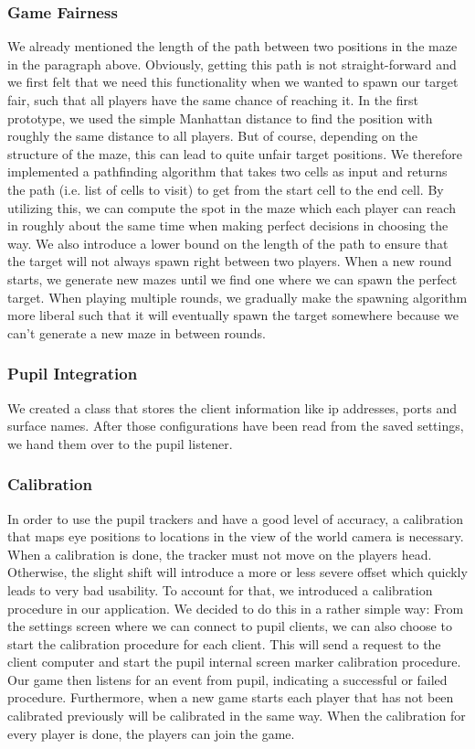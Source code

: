 \documentclass{sigchi}
\begin{document}
\subsubsection{Game Fairness}
We already mentioned the length of the path between two positions in the maze in the paragraph above. Obviously, getting this path is not straight-forward and we first felt that we need this functionality when we wanted to spawn our target fair, such that all players have the same chance of reaching it. In the first prototype, we used the simple Manhattan distance to find the position with roughly the same distance to all players. But of course, depending on the structure of the maze, this can lead to quite unfair target positions. We therefore implemented a pathfinding algorithm that takes two cells as input and returns the path (i.e. list of cells to visit) to get from the start cell to the end cell. By utilizing this, we can compute the spot in the maze which each player can reach in roughly about the same time when making perfect decisions in choosing the way. We also introduce a lower bound on the length of the path to ensure that the target will not always spawn right between two players. When a new round starts, we generate new mazes until we find one where we can spawn the perfect target. When playing multiple rounds, we gradually make the spawning algorithm more liberal such that it will eventually spawn the target somewhere because we can't generate a new maze in between rounds.

\subsubsection{Pupil Integration}
We created a class that stores the client information like ip addresses, ports and surface names. After those configurations have been read from the saved settings, we hand them over to the pupil listener.

\subsubsection{Calibration}
In order to use the pupil trackers and have a good level of accuracy, a calibration that maps eye positions to locations in the view of the world camera is necessary. When a calibration is done, the tracker must not move on the players head. Otherwise, the slight shift will introduce a more or less severe offset which quickly leads to very bad usability. To account for that, we introduced a calibration procedure in our application. We decided to do this in a rather simple way: From the settings screen where we can connect to pupil clients, we can also choose to start the calibration procedure for each client. This will send a request to the client computer and start the pupil internal screen marker calibration procedure. Our game then listens for an event from pupil, indicating a successful or failed procedure. Furthermore, when a new game starts each player that has not been calibrated previously will be calibrated in the same way. When the calibration for every player is done, the players can join the game.
\end{document}
